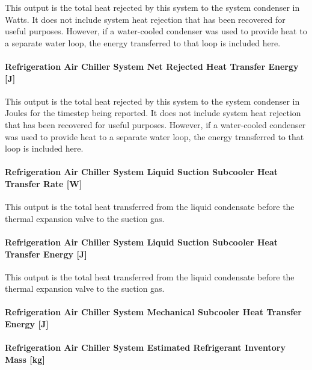 This output is the total heat rejected by this system to the system condenser in Watts. It does not include system heat rejection that has been recovered for useful purposes. However, if a water-cooled condenser was used to provide heat to a separate water loop, the energy transferred to that loop is included here.

\paragraph{Refrigeration Air Chiller System Net Rejected Heat Transfer Energy {[}J{]}}\label{refrigeration-air-chiller-system-net-rejected-heat-transfer-energy-j}

This output is the total heat rejected by this system to the system condenser in Joules for the timestep being reported. It does not include system heat rejection that has been recovered for useful purposes. However, if a water-cooled condenser was used to provide heat to a separate water loop, the energy transferred to that loop is included here.

\paragraph{Refrigeration Air Chiller System Liquid Suction Subcooler Heat Transfer Rate {[}W{]}}\label{refrigeration-air-chiller-system-liquid-suction-subcooler-heat-transfer-rate-w}

This output is the total heat transferred from the liquid condensate before the thermal expansion valve to the suction gas.

\paragraph{Refrigeration Air Chiller System Liquid Suction Subcooler Heat Transfer Energy {[}J{]}}\label{refrigeration-air-chiller-system-liquid-suction-subcooler-heat-transfer-energy-j}

This output is the total heat transferred from the liquid condensate before the thermal expansion valve to the suction gas.

\paragraph{Refrigeration Air Chiller System Mechanical Subcooler Heat Transfer Energy {[}J{]}}\label{refrigeration-air-chiller-system-mechanical-subcooler-heat-transfer-energy-j}

\paragraph{Refrigeration Air Chiller System Estimated Refrigerant Inventory Mass {[}kg{]}}\label{refrigeration-air-chiller-system-estimated-refrigerant-inventory-mass-kg}

